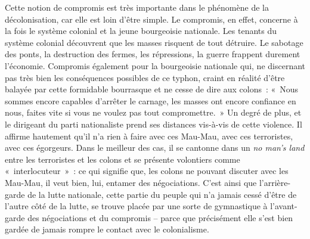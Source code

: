 \documentclass[french,twoside]{book} %
\begin{document}
\noindent Cette notion de compromis est très importante dans le phénomène de la décolonisation, car elle est loin d’être simple. Le compromis, en effet, concerne à la fois le système colonial et la jeune bourgeoisie nationale. Les tenants du système colonial découvrent que les masses risquent de tout détruire. Le sabotage des ponts, la destruction des fermes, les répressions, la guerre frappent durement l’économie. Compromis également pour la bourgeoisie nationale qui, ne discernant pas très bien les conséquences possibles de ce typhon, craint en réalité d’être balayée par cette formidable bourrasque et ne cesse de dire aux colons : « Nous sommes encore capables d’arrêter le carnage, les masses ont encore confiance en nous, faites vite si vous ne voulez pas tout compromettre. » Un degré de plus, et le dirigeant du parti nationaliste prend ses distances vis-à-vis de cette violence. Il affirme hautement qu’il n’a rien à faire avec ces Mau-Mau, avec ces terroristes, avec ces égorgeurs. Dans le meilleur des cas, il se cantonne dans un \emph{no man’s land} entre les terroristes et les colons et se présente volontiers comme « interlocuteur » : ce qui signifie que, les colons ne pouvant discuter avec les Mau-Mau, il veut bien, lui, entamer des négociations. C’est ainsi que l’arrière-garde de la lutte nationale, cette partie du peuple qui n’a jamais cessé d’être de l’autre côté de la lutte, se trouve placée par une sorte de gymnastique à l’avant-garde des négociations et du compromis – parce que précisément elle s’est bien gardée de jamais rompre le contact avec le colonialisme.\par
\end{document}
